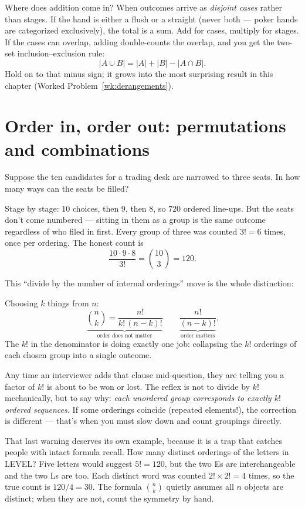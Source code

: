 Where does addition come in? When outcomes arrive as \emph{disjoint cases} rather than stages. If the hand is either a flush or a straight (never both --- poker hands are categorized exclusively), the total is a sum. Add for cases, multiply for stages. If the cases can overlap, adding double-counts the overlap, and you get the two-set inclusion--exclusion rule:
\[
|A \cup B| = |A| + |B| - |A \cap B|.
\]
Hold on to that minus sign; it grows into the most surprising result in this chapter (Worked Problem~\ref{wk:derangements}).

\section{Order in, order out: permutations and combinations}\label{sec:permcomb}

Suppose the ten candidates for a trading desk are narrowed to three seats. In how many ways can the seats be filled?

Stage by stage: $10$ choices, then $9$, then $8$, so $720$ ordered line-ups. But the seats don't come numbered --- sitting in them as a group is the same outcome regardless of who filed in first. Every group of three was counted $3! = 6$ times, once per ordering. The honest count is
\[
\frac{10 \cdot 9 \cdot 8}{3!} = \binom{10}{3} = 120.
\]

This ``divide by the number of internal orderings'' move is the whole distinction:

\begin{notebox}
Choosing $k$ things from $n$:
\[
\underbrace{\binom{n}{k} = \frac{n!}{k!\,(n-k)!}}_{\text{order does not matter}}
\qquad
\underbrace{\frac{n!}{(n-k)!}}_{\text{order matters}}.
\]
The $k!$ in the denominator is doing exactly one job: collapsing the $k!$ orderings of each chosen group into a single outcome.
\end{notebox}

\begin{probe}
Any time an interviewer adds that clause mid-question, they are telling you a factor of $k!$ is about to be won or lost. The reflex is not to divide by $k!$ mechanically, but to say why: \emph{each unordered group corresponds to exactly $k!$ ordered sequences.} If some orderings coincide (repeated elements!), the correction is different --- that's when you must slow down and count groupings directly.
\end{probe}

That last warning deserves its own example, because it is a trap that catches people with intact formula recall. How many distinct orderings of the letters in \textsc{LEVEL}? Five letters would suggest $5! = 120$, but the two \textsc{E}s are interchangeable and the two \textsc{L}s are too. Each distinct word was counted $2!\times 2! = 4$ times, so the true count is $120/4 = 30$. The formula $\binom{n}{k}$ quietly assumes all $n$ objects are distinct; when they are not, count the symmetry by hand.


